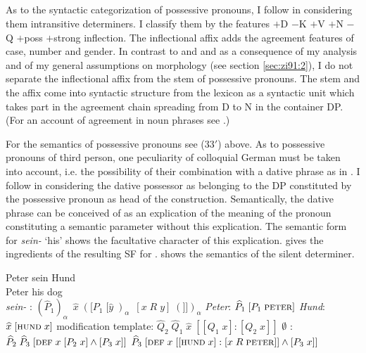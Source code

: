 \documentclass[output=paper,colorlinks,citecolor=brown]{langscibook}
\begin{document}
\subsection{} \label{sec:zi91:5.2}

As to the syntactic categorization of possessive pronouns, I follow \citet{Olsen89Das-Possessivum} in considering them intransitive determiners. I classify them by the features $+$D $-$K $+$V $+$N $-$Q $+$poss $+$strong inflection. The inflectional affix adds the agreement features of case, number and gender. In contrast to \citet{Olsen89Das-Possessivum} and \citet{Bhatt90Die-syntaktische} and as a consequence of my analysis and of my general assumptions on morphology (see section \ref{sec:zi91:2}), I do not separate the inflectional affix from the stem of possessive pronouns. The stem and the affix come into syntactic structure from the lexicon as a syntactic unit which takes part in the agreement chain spreading from D to N in the container DP. (For an account of agreement in noun phrases see \citealt{Olsen88Agreement-und-Flexion, Olsen89AGReement-in}.)

For the semantics of possessive pronouns see (33$'$) above. As to possessive pronouns of third person, one peculiarity of colloquial German must be taken into account, i.e. the possibility of their combination with a dative phrase as in . I follow \citet{Bhatt90Die-syntaktische} in considering the dative possessor as belonging to the DP constituted by the possessive pronoun as head of the construction. Semantically, the dative phrase can be conceived of as an explication of the meaning of the pronoun constituting a semantic parameter without this explication. The semantic form  for \textit{sein-} `his' shows the facultative character of this explication.  gives the ingredients of the resulting SF  for .  shows the semantics of the silent determiner.

\largerpage

\ea \label{ex:zi91:53}
    \gll Peter sein Hund\\
    Peter his dog\\
    
\ex \label{ex:zi91:54}
    \ea \label{ex:zi91:54a} \textit{sein-} : $( {\widehat{P}}_{1})_{\alpha} \;\: \widehat{x} \; ([{P}_{1} \; [\widehat{y} \; )_{\alpha} \;\: [x \; R \; y] \; (]])_{\alpha}$
    \ex \label{ex:zi91:54b} \textit{Peter}: ${\widehat{P}_{1}} \; [P_{1} \; \textsc{peter}]$
    \ex \label{ex:zi91:54c} \textit{Hund}: $\widehat{x} \; [\textsc{hund} \; x]$
    \ex \label{ex:zi91:54d} modification template: $\widehat{Q}_{2} \; \widehat{Q}_{1} \; \widehat{x} \; [[Q_{1} \; x]:[Q_{2} \; x ]]$
    \ex \label{ex:zi91:54e} $\emptyset$ : $\widehat{P}_{2} \; \widehat{P}_{3} \; [\textsc{def} \; x \; [P_{2} \; x] \wedge [P_{3} \; x]]$ 
    \z
\ex \label{ex:zi91:55} $\widehat{P}_{3} \; [\textsc{def} \; x \; [[\textsc{hund} \; x]:[x \; R \; \textsc{peter}]] \wedge [P_{3} \; x]]$
\z
\end{document}
